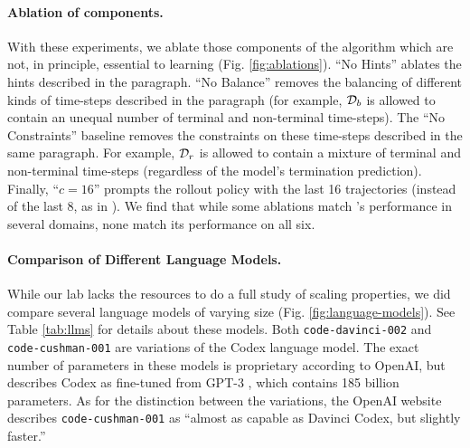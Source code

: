 \documentclass{article}
\newcommand\NoBalance{``No Balance''}
\newcommand\NoConstraints{``No Constraints''}
\newcommand\CSixteen{``$c=16$''}
\newcommand\NoHints{``No Hints''}
\begin{document}
\paragraph{Ablation of \Algorithm{} components.} With these experiments, we
ablate those components of the algorithm which are not, in principle, essential
to learning (Fig. \ref{fig:ablations}). \NoHints{} ablates the hints described in
the  paragraph. \NoBalance{} removes the balancing
of different kinds of time-steps described in the 
paragraph (for example, $\Buffer_{\Ter}$ is allowed to contain an unequal number
of terminal and non-terminal time-steps). The \NoConstraints{} baseline removes
the constraints on these time-steps described in the same paragraph. For
example,
$\Buffer_{\Rew}$ is allowed to contain a mixture of terminal and non-terminal
time-steps (regardless of the model's termination prediction). Finally, \CSixteen{} prompts the rollout
policy with the last 16 trajectories (instead of the last 8, as in
\Algorithm{}). We find that while some ablations match \Algorithm{}'s
performance in several domains, none match its performance on all six.

\paragraph{Comparison of Different Language Models.} While our lab lacks the
resources to do a full study of scaling properties, we did compare several
language models of varying size (Fig. \ref{fig:language-models}). See Table \ref{tab:llms} for details about
these models. Both \texttt{code-davinci-002} and \texttt{code-cushman-001} are
variations of the Codex language model. The exact number of parameters in these
models is proprietary according to OpenAI, but \cite{chen_evaluating_2021}
describes Codex as fine-tuned from GPT-3 \cite{brown_language_2020}, which
contains 185 billion parameters. As for the distinction between the variations,
the OpenAI website describes \texttt{code-cushman-001} as ``almost as capable as
Davinci Codex, but slightly faster.''
\end{document}
